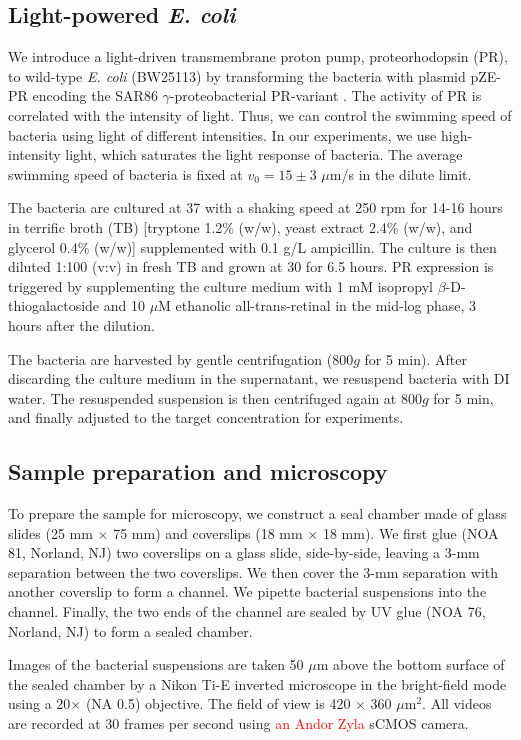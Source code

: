 \documentclass[twocolumn,aps,prx,amsmath,amssymb,longbibliography,superscriptaddress]{revtex4-2}
\begin{document}
\subsection{Light-powered \textit{E. coli}}
We introduce a light-driven transmembrane proton pump, proteorhodopsin (PR), to wild-type \textit{E. coli} (BW25113) by transforming the bacteria with plasmid pZE-PR encoding the SAR86 $\gamma$-proteobacterial PR-variant \cite{Walter2007}. The activity of PR is correlated with the intensity of light. Thus, we can control the swimming speed of bacteria using light of different intensities. In our experiments, we use high-intensity light, which saturates the light response of bacteria. The average swimming speed of bacteria is fixed at $v_0 = 15 \pm 3$ $\mu$m/s in the dilute limit.

The bacteria are cultured at 37 \textcelsius{} with a shaking speed at 250 rpm for 14-16 hours in terrific broth (TB) [tryptone 1.2\% (w/w), yeast extract 2.4\% (w/w), and glycerol 0.4\% (w/w)] supplemented with 0.1 g/L ampicillin. The culture is then diluted 1:100 (v:v) in fresh TB and grown at 30 \textcelsius{} for 6.5 hours. PR expression is triggered by supplementing the culture medium with 1 mM isopropyl $\beta$-D-thiogalactoside and 10  $\mu$M ethanolic all-trans-retinal in the mid-log phase, 3 hours after the dilution.

The bacteria are harvested by gentle centrifugation ($800g$ for 5 min). After discarding the culture medium in the supernatant, we resuspend bacteria with DI water. The resuspended suspension is then centrifuged again at $800g$ for 5 min, and finally adjusted to the target concentration for experiments.

\subsection{Sample preparation and microscopy}

To prepare the sample for microscopy, we construct a seal chamber made of glass slides (25 mm $\times$ 75 mm) and coverslips (18 mm $\times$ 18 mm). We first glue (NOA 81, Norland, NJ) two coverslips on a glass slide, side-by-side, leaving a 3-mm separation between the two coverslips. We then cover the 3-mm separation with another coverslip to form a channel. We pipette bacterial suspensions into the channel. Finally, the two ends of the channel are sealed by UV glue (NOA 76, Norland, NJ) to form a sealed chamber.

Images of the bacterial suspensions are taken 50 $\mu$m above the bottom surface of the sealed chamber by a Nikon Ti-E inverted microscope in the bright-field mode using a 20$\times$ (NA 0.5) objective. The field of view is 420 $\times$ 360 $\mu$m$^2$. All videos are recorded at 30 frames per second using \textcolor{red}{an Andor Zyla} sCMOS camera.
\end{document}
